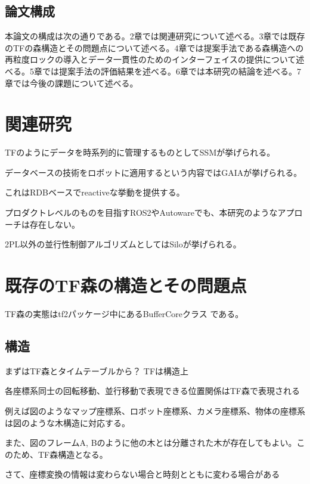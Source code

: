\documentclass{jarticle}
\begin{document}
\begin{multicols}{2}

\subsection{論文構成}
本論文の構成は次の通りである。2章では関連研究について述べる。3章では既存のTFの森構造とその問題点について述べる。4章では提案手法である森構造への再粒度ロックの導入とデータ一貫性のためのインターフェイスの提供について述べる。5章では提案手法の評価結果を述べる。6章では本研究の結論を述べる。7章では今後の課題について述べる。


\section{関連研究}

TFのようにデータを時系列的に管理するものとしてSSMが挙げられる。

データベースの技術をロボットに適用するという内容ではGAIA\cite{gaia}が挙げられる。

これはRDBベースでreactiveな挙動を提供する。

プロダクトレベルのものを目指すROS2\cite{ros2}やAutoware\cite{autoware}でも、本研究のようなアプローチは存在しない。

2PL以外の並行性制御アルゴリズムとしてはSilo\cite{silo}が挙げられる。



\section{既存のTF森の構造とその問題点}

TF森の実態はtf2パッケージ中にあるBufferCoreクラス\cite{buffer-core} である。
\subsection{構造}
まずはTF森とタイムテーブルから？
TFは構造上

各座標系同士の回転移動、並行移動で表現できる位置関係はTF森で表現される

例えば図のようなマップ座標系、ロボット座標系、カメラ座標系、物体の座標系は図のような木構造に対応する。

また、図のフレームA, Bのように他の木とは分離された木が存在してもよい。このため、TF森構造となる。


さて、座標変換の情報は変わらない場合と時刻とともに変わる場合がある


\end{multicols}
\end{document}
